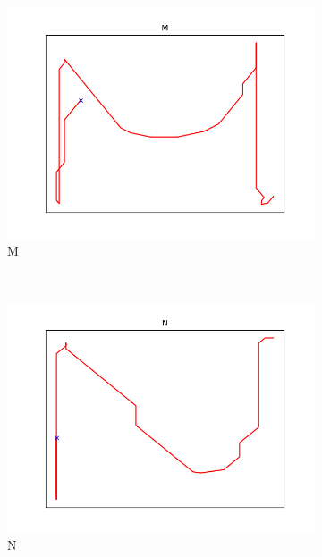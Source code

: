 \begin{figure}
\begin{subfigure}[b]{0.14\textwidth}
        \includegraphics[width=\textwidth]{images/gbem/letters_generated/M.png}
        \caption{M}
    \end{subfigure}
    ~
    \begin{subfigure}[b]{0.14\textwidth}
        \includegraphics[width=\textwidth]{images/gbem/letters_generated/N.png}
        \caption{N}
    \end{subfigure}
    ~
    \begin{subfigure}[b]{0.14\textwidth}

\end{subfigure}
\end{figure}
